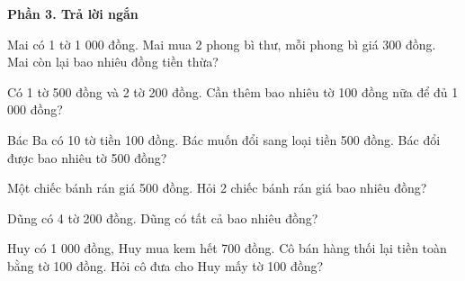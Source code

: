 \textbf{Phần 3. Trả lời ngắn}

\begin{ex} %
Mai có 1 tờ 1 000 đồng. Mai mua 2 phong bì thư, mỗi phong bì giá 300 đồng. Mai còn lại bao nhiêu đồng tiền thừa?
\end{ex}

\begin{ex} %
Có 1 tờ 500 đồng và 2 tờ 200 đồng. Cần thêm bao nhiêu tờ 100 đồng nữa để đủ 1 000 đồng?
\end{ex}

\begin{ex} %
Bác Ba có 10 tờ tiền 100 đồng. Bác muốn đổi sang loại tiền 500 đồng. Bác đổi được bao nhiêu tờ 500 đồng?
\end{ex}

\begin{ex} %
Một chiếc bánh rán giá 500 đồng. Hỏi 2 chiếc bánh rán giá bao nhiêu đồng?
\end{ex}

\begin{ex} %
Dũng có 4 tờ 200 đồng. Dũng có tất cả bao nhiêu đồng?
\end{ex}

\begin{ex} %
Huy có 1 000 đồng, Huy mua kem hết 700 đồng. Cô bán hàng thối lại tiền toàn bằng tờ 100 đồng. Hỏi cô đưa cho Huy mấy tờ 100 đồng?
\end{ex}
